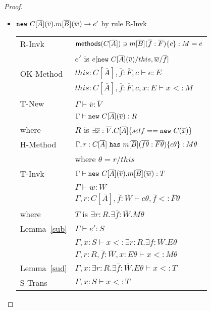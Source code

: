 \begin{proof}
\begin{itemize}
\item ${\tt new}~C[\overline{A}](\overline{v}).m[\overline{B}](\overline{w}) \rightarrow e'$ by rule {\sc R-Invk}
\\
\begin{tabular}{ll}
{\sc R-Invk} & ${\sf methods}(C[\overline{A}]) \ni m[\overline{B}](\overline{f}:\overline{F})\{c\}:M=e$
\\
& $e'$ is $e[{\tt new}~C[\overline{A}](\overline{v})/this,\overline{w}/\overline{f}]$
\\
{\sc OK-Method} & $this:C[\overline{A}],\overline{f}:\overline{F},c\vdash e:E$
\\
& $this:C[\overline{A}],\overline{f}:\overline{F},c,x:E\vdash x<:M$
\\
{\sc T-New} & $\Gamma\vdash\overline{v}:\overline{V}$
\\
& $\Gamma\vdash{\tt new}~C[\overline{A}](\overline{v}):R$
\\
where & $R$ is $\exists\overline{x}:\overline{V}.C[\overline{A}]\{self=={\tt new}~C(\overline{x})\}$
\\
{\sc H-Method} & $\Gamma, r:C[\overline{A}]~{\tt has}~m[\overline{B}](\overline{f\theta}:\overline{F\theta})\{c\theta\}:M\theta$
\\
& where $\theta=r/this$
\\
{\sc T-Invk} & $\Gamma\vdash{\tt new}~C[\overline{A}](\overline{v}).m[\overline{B}](\overline{w}):T$
\\
& $\Gamma\vdash\overline{w}:\overline{W}$
\\
& $\Gamma,r:C[\overline{A}],\overline{f}:\overline{W}\vdash c\theta, \overline f<:\overline{F}\theta$
\\
where & $T$ is $\exists r:R.\exists \overline{f}:\overline{W}.M\theta$
\\
Lemma~\ref{sub} & $\Gamma\vdash e':S$
\\
& $\Gamma,x:S\vdash x<:\exists r:R.\exists \overline{f}:\overline{W}.E\theta$
\\
& $\Gamma,r:R,\overline{f}:\overline{W},x:E\theta\vdash x<:M\theta$
\\
Lemma~\ref{sud} & $\Gamma,x:\exists r:R.\exists \overline{f}:\overline{W}.E\theta\vdash x<:T$
\\
{\sc S-Trans} & $\Gamma,x:S\vdash x<:T$
\end{tabular}



\end{itemize}
\end{proof}

